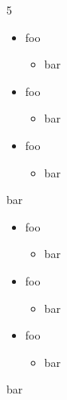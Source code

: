 5

\begin{itemize}
\item foo

\begin{itemize}
\item bar
\end{itemize}
\item foo

\begin{itemize}
\item bar
\end{itemize}
\item foo

\begin{itemize}
\item bar
\end{itemize}
\end{itemize}

bar

\begin{itemize}
\item foo

\begin{itemize}
\item bar
\end{itemize}
\item foo

\begin{itemize}
\item bar
\end{itemize}
\item foo

\begin{itemize}
\item bar
\end{itemize}
\end{itemize}

bar


